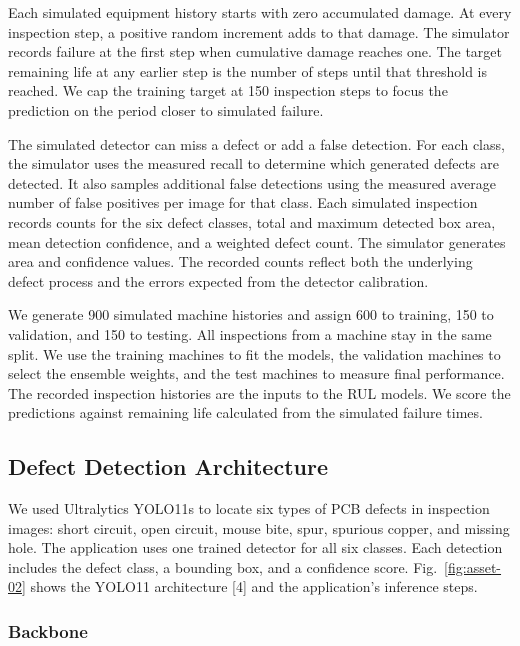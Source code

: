 \documentclass[conference]{IEEEtran}
\begin{document}
Each simulated equipment history starts with zero accumulated damage. At every inspection step, a positive random increment adds to that damage. The simulator records failure at the first step when cumulative damage reaches one. The target remaining life at any earlier step is the number of steps until that threshold is reached. We cap the training target at 150 inspection steps to focus the prediction on the period closer to simulated failure.

The simulated detector can miss a defect or add a false detection. For each class, the simulator uses the measured recall to determine which generated defects are detected. It also samples additional false detections using the measured average number of false positives per image for that class. Each simulated inspection records counts for the six defect classes, total and maximum detected box area, mean detection confidence, and a weighted defect count. The simulator generates area and confidence values. The recorded counts reflect both the underlying defect process and the errors expected from the detector calibration.

We generate 900 simulated machine histories and assign 600 to training, 150 to validation, and 150 to testing. All inspections from a machine stay in the same split. We use the training machines to fit the models, the validation machines to select the ensemble weights, and the test machines to measure final performance. The recorded inspection histories are the inputs to the RUL models. We score the predictions against remaining life calculated from the simulated failure times.

\subsection{Defect Detection Architecture}

We used Ultralytics YOLO11s to locate six types of PCB defects in inspection images: short circuit, open circuit, mouse bite, spur, spurious copper, and missing hole. The application uses one trained detector for all six classes. Each detection includes the defect class, a bounding box, and a confidence score. Fig.~\ref{fig:asset-02} shows the YOLO11 architecture [4] and the application’s inference steps.

\subsubsection{Backbone}
\end{document}
